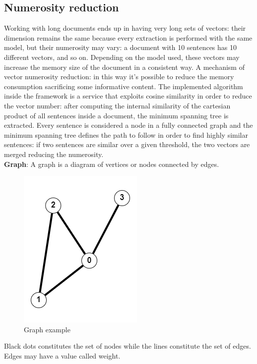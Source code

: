 \documentclass[\main/main.tex]{subfiles}
\begin{document}
\subsection{Numerosity reduction}
Working with long documents ends up in having very long sets of vectors: their dimension remains the same because every extraction is performed with the same model, but their numerosity may vary: a document with 10 sentences has 10 different vectors, and so on. Depending on the model used, these vectors may increase the memory size of the document in a consistent way. A mechanism of vector numerosity reduction: in this way it's possible to reduce the memory consumption sacrificing some informative content. The implemented algorithm inside the framework is a service that exploits cosine similarity in order to reduce the vector number: after computing the internal similarity of the cartesian product of all sentences inside a document, the minimum spanning tree is extracted. Every sentence is considered a node in a fully connected graph and the minimum spanning tree defines the path to follow in order to find highly similar sentences: if two sentences are similar over a given threshold, the two vectors are merged reducing the numerosity. \\
\textbf{Graph}:
A graph is a diagram of vertices or nodes connected by edges.
\begin{center}
    \begin{figure}[h]
    \centering
    \includegraphics[scale=1]{images/methods/graph_example.png}
    \caption{Graph example}
    \label{fig:graph_example}
\end{figure}
\end{center}
Black dots constitutes the set of nodes while the lines constitute the set of edges. Edges may have a value called weight. \cite{Siu1998IntroductionTG}\\
\end{document}
